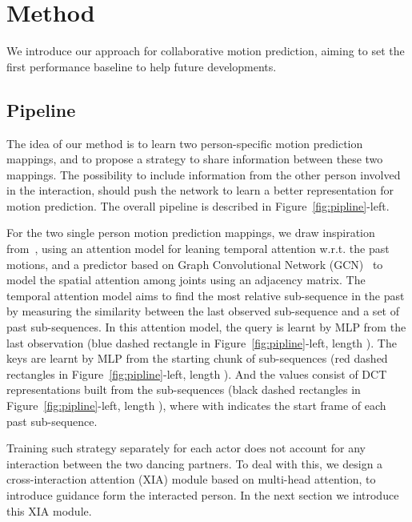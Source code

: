 
\section{Method}
We introduce our approach for collaborative motion prediction, aiming to set the first performance baseline to help future developments.

\subsection{Pipeline}
\label{sec:pipeline}
The idea of our method is to learn two person-specific motion prediction mappings, and to propose a strategy to share information between these two mappings. The possibility to include information from the other person involved in the interaction, should push the network to learn a better representation for motion prediction.
The overall pipeline is described in Figure~\ref{fig:pipline}-left.

For the two single person motion prediction mappings, we draw inspiration from~\cite{mao2020history}, using an attention model for leaning temporal attention w.r.t. the past motions, and a predictor based on Graph Convolutional Network (GCN)~\cite{kipf2016semi} to model the spatial attention among joints using an adjacency matrix. The temporal attention model aims to find the most relative sub-sequence in the past by measuring the similarity between the last observed sub-sequence and a set of past sub-sequences.
In this attention model, the query  is learnt by MLP from the last observation   (blue dashed rectangle in Figure~\ref{fig:pipline}-left, length ). The keys  are learnt by MLP from the starting chunk of sub-sequences (red dashed rectangles in Figure~\ref{fig:pipline}-left, length ).  And the values  consist of DCT representations built from the sub-sequences  (black dashed rectangles in Figure~\ref{fig:pipline}-left, length ), where  with  indicates the start frame of each past sub-sequence. 

Training such strategy separately for each actor does not account for any interaction between the two dancing partners. To deal with this, we design a cross-interaction attention (XIA) module based on multi-head attention, to introduce guidance form the interacted person. In the next section we introduce this XIA module.

